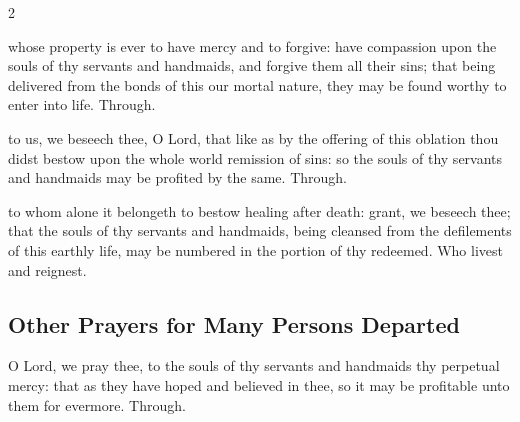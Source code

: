 \begin{multicols}{2}
\vspace{-0.25\baselineskip}

\collect

\vspace{-0.25\baselineskip}

 whose property is ever to have mercy and to forgive: have compassion upon the souls of thy servants and handmaids, and forgive them all their sins; that being delivered from the bonds of this our mortal nature, they may be found worthy to enter into life. Through.

\vspace{-0.75\baselineskip}

\secret

\vspace{-0.25\baselineskip}

 to us, we beseech thee, O Lord, that like as by the offering of this oblation thou didst bestow upon the whole world remission of sins: so the souls of thy servants and handmaids may be profited by the same. Through.

\newcolumn

\postcommunion

\vspace{-0.25\baselineskip}

 to whom alone it belongeth to bestow healing after death: grant, we beseech thee; that the souls of thy servants and handmaids, being cleansed from the defilements of this earthly life, may be numbered in the portion of thy redeemed. Who livest and reignest.

\subsection{Other Prayers for Many Persons Departed}

\collect

\vspace{-0.25\baselineskip}

 O Lord, we pray thee, to the souls of thy servants and handmaids thy perpetual mercy: that as they have hoped and believed in thee, so it may be profitable unto them for evermore. Through.

\vspace{-0.5\baselineskip}


\end{multicols}
